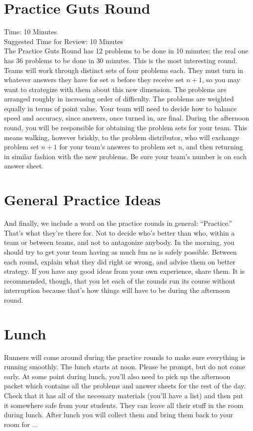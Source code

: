 \documentclass[11pt]{article}
\begin{document}
\begin{small}
\section{Practice Guts Round}
\noindent Time: 10 Minutes \\
\noindent Suggested Time for Review: 10 Minutes\\
\noindent The Practice Guts Round has 12 problems to be done in 10 minutes; the real one has 36 problems to be done in 30 minutes.  This is the most interesting round. Teams will work through distinct sets of four problems each. They must turn in whatever answers they have for set $n$ before they receive set $n+1$, so you may want to strategize with them about this new dimension. The problems are arranged roughly in increasing order of difficulty. The problems are weighted equally in terms of point value. Your team will need to decide how to balance speed and accuracy, since answers, once turned in, are final.  During the afternoon round, you will be responsible for obtaining the problem sets for your team. This means walking, however briskly, to the problem distributor, who will exchange problem set $n + 1$ for your team's answers to problem set $n$, and then returning in similar fashion with the new problems. Be sure your team's number is on each answer sheet.

\section{General Practice Ideas}
\noindent And finally, we include a word on the practice rounds in general: ``Practice.'' That's what they're there for. Not to decide who's better than who, within a team or between teams, and not to antagonize anybody. In the morning, you should try to get your team having as much fun as is safely possible. Between each round, explain what they did right or wrong, and advise them on better strategy. If you have any good ideas from your own experience, share them. It is recommended, though, that you let each of the rounds run its course without interruption because that's how things will have to be during the afternoon round.

\section{Lunch}
\noindent Runners will come around during the practice rounds to make sure everything is running smoothly. The lunch starts at noon. Please be prompt, but do not come early. At some point during lunch, you'll also need to pick up the afternoon packet which contains all the problems and answer sheets for the rest of the day. Check that it has all of the necessary materials (you'll have a list) and then put it somewhere safe from your students. They can leave all their stuff in the room during lunch. After lunch you will collect them and bring them back to your room for ...


\end{small}
\end{document}
